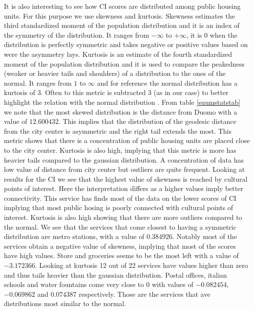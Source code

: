 \documentclass[11pt, titlepage]{article}
\begin{document}
It is also interesting to see how CI scores are distributed among public housing units. For this purpose we use skewness and kurtosis. Skewness estimates the third standardized moment of the population distribution and it is an index of the symmetry of the distribution. It ranges from $-\infty$ to $+\infty$, it is $0$ when the distribution is perfectly symmetric and takes negative or positive values based on were the asymmetry lays. Kurtosis is an estimate of the fourth standardized moment of the population distribution and it is used to compare the peakedness (weaker or heavier tails and shoulders) of a distribution to the ones of the normal. It ranges from $1$ to $\infty$ and for reference the normal distribution has a kurtosis of $3$. Often to this metric is subtracted 3 (as in our case) to better highlight the relation with the normal distribution  \parencite{ho_descriptive_2015}. From table \ref{suumstatstab} we note that the most skewed distribution is the distance from Duomo with a value of $12.600432$. This implies that the distribution of the geodesic distance from the city center is asymmetric and the  right tail extends the most. This metric shows that there is a concentration of public housing units are placed close to the city center. Kurtosis is also high, implying that this metric is more has heavier tails compared to the gaussian distribution. A concentration of data has low value of distance from city center but outliers are quite frequent.  Looking at results for the CI we see that the highest value of skewness is reached by cultural points of interest. Here the interpretation differs as a higher values imply better connectivity. This service has finds most of the data on the lower scores of CI implying that most public hosing is poorly connected with cultural points of interest. Kurtosis is also high showing that there are more outliers compared to the normal. We see that the services that come closest to having a symmetric distribution are metro stations, with a value of $0.384926$. Notably most of the services obtain a negative value of skewness, implying that most of the scores have high values. Store and groceries seems to be the most left with a value of $-3.172366$. Looking at kurtosis 12 out of 22 services have values higher than zero and thus tails heavier than the gaussian distribution. Postal offices, italian schools and water fountains come very close to 0 with values of $-0.082454$, $-0.069862$ and $0.074387$ respectively. Those are the services that ave distributions most similar to the normal.
\end{document}
